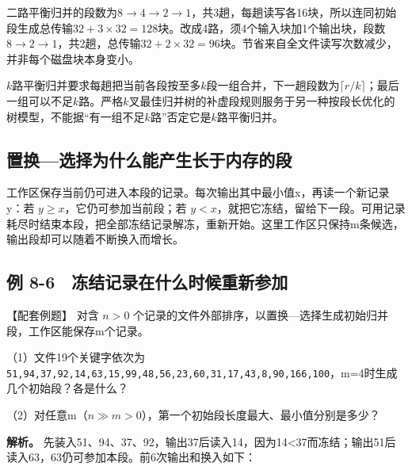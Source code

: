 二路平衡归并的段数为\(8\to4\to2\to1\)，共3趟，每趟读写各16块，所以连同初始段生成总传输\(32+3\times32=128\)块。改成4路，须4个输入块加1个输出块，段数\(8\to2\to1\)，共2趟，总传输\(32+2\times32=96\)块。节省来自全文件读写次数减少，并非每个磁盘块本身变小。

\(k\)路平衡归并要求每趟把当前各段按至多\(k\)段一组合并，下一趟段数为\(\lceil r/k\rceil\)；最后一组可以不足\(k\)路。严格\(k\)叉最佳归并树的补虚段规则服务于另一种按段长优化的树模型，不能据``有一组不足\(k\)路''否定它是\(k\)路平衡归并。

\subsection{置换---选择为什么能产生长于内存的段}\label{ux7f6eux6362ux9009ux62e9ux4e3aux4ec0ux4e48ux80fdux4ea7ux751fux957fux4e8eux5185ux5b58ux7684ux6bb5}

工作区保存当前仍可进入本段的记录。每次输出其中最小值x，再读一个新记录y：若 \(y\ge x\)，它仍可参加当前段；若 \(y<x\)，就把它冻结，留给下一段。可用记录耗尽时结束本段，把全部冻结记录解冻，重新开始。这里工作区只保持m条候选，输出段却可以随着不断换入而增长。

\subsection{例 8-6　冻结记录在什么时候重新参加}\label{DS08-ex6}

\begin{example}[配套案例]

【配套例题】 对含 \(n>0\) 个记录的文件外部排序，以置换---选择生成初始归并段，工作区能保存m个记录。

（1）文件19个关键字依次为 \texttt{51,\allowbreak{}94,\allowbreak{}37,\allowbreak{}92,\allowbreak{}14,\allowbreak{}63,\allowbreak{}15,\allowbreak{}99,\allowbreak{}48,\allowbreak{}56,\allowbreak{}23,\allowbreak{}60,\allowbreak{}31,\allowbreak{}17,\allowbreak{}43,\allowbreak{}8,\allowbreak{}90,\allowbreak{}166,\allowbreak{}100}，m=4时生成几个初始段？各是什么？

（2）对任意m（\(n\gg m>0\)），第一个初始段长度最大、最小值分别是多少？

\end{example}

\textbf{解析。} 先装入51、94、37、92，输出37后读入14，因为14\textless37而冻结；输出51后读入63，63仍可参加本段。前6次输出和换入如下：


